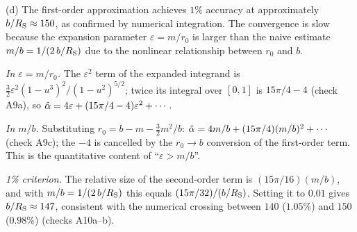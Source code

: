 (d) The first-order approximation achieves $1\%$ accuracy at
approximately $b/R_{\mathrm{S}} \approx 150$, as confirmed by numerical integration.
The convergence is slow because the expansion parameter
$\varepsilon = m/r_0$ is larger than the naive estimate $m/b = 1/(2\,b/R_{\mathrm{S}})$
due to the nonlinear relationship between $r_0$ and $b$.

\begin{derivation}
\textit{In $\varepsilon = m/r_0$.}  The $\varepsilon^2$ term of the expanded
integrand is $\tfrac32\varepsilon^2(1-u^3)^2/(1-u^2)^{5/2}$; twice its integral
over $[0,1]$ is $15\pi/4 - 4$ (check A9a), so
$\hat{\alpha} = 4\varepsilon + (15\pi/4 - 4)\varepsilon^2 + \cdots$.

\textit{In $m/b$.}  Substituting $r_0 = b - m - \tfrac32m^2/b$:
$\hat{\alpha} = 4m/b + (15\pi/4)(m/b)^2 + \cdots$ (check A9c); the $-4$ is
cancelled by the $r_0 \to b$ conversion of the first-order term.  This is the
quantitative content of ``$\varepsilon > m/b$''.

\textit{1\% criterion.}  The relative size of the second-order term is
$(15\pi/16)(m/b)$, and with $m/b = 1/(2\,b/R_{\mathrm{S}})$ this equals
$(15\pi/32)/(b/R_{\mathrm{S}})$.  Setting it to $0.01$ gives $b/R_{\mathrm{S}} \approx 147$,
consistent with the numerical crossing between $140$ ($1.05\%$) and $150$
($0.98\%$) (checks A10a--b).
\end{derivation}
